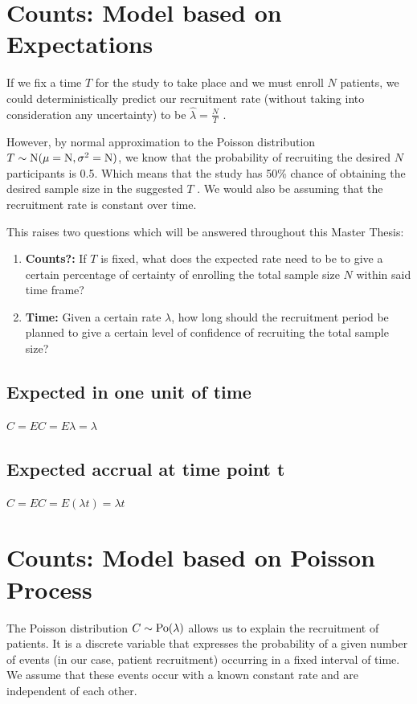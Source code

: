 \section{Counts: Model based on Expectations}

If we fix a time $T$ for the study to take place and we must enroll $N$ patients, we could deterministically predict our recruitment rate (without taking into consideration any uncertainty) to be $\hat{\lambda}=\frac{N}{T}$ . 

However, by normal approximation to the Poisson distribution $T\sim \rm{N}(\mu=N, \sigma^2=N)$, we know that the probability of recruiting the desired $N$ participants is 0.5. Which means that the study has 50\% chance of obtaining the desired sample size in the suggested $T$ \citep{carter2004application}. We would also be assuming that the recruitment rate is constant over time.

This raises two questions which will be answered throughout this Master Thesis:
\begin{enumerate}
\item \textbf{Counts?:} If $T$ is fixed, what does the expected rate need to be to give a certain percentage of certainty of enrolling the total sample size $N$ within said time frame?
\item \textbf{Time:} Given a certain rate $\lambda$, how long should the recruitment period be planned to give a certain level of confidence of recruiting the total sample size?
\end{enumerate}

\subsection{Expected in one unit of time}
$C = EC = E\lambda = \lambda$

\subsection{Expected accrual at time point t}
$C = EC = E(\lambda t) = \lambda t$

\section{Counts: Model based on Poisson Process}

The Poisson distribution $C\sim \rm{Po} (\lambda)$ allows us to explain the recruitment of patients. It is a discrete variable that expresses the probability of a given number of events (in our case, patient recruitment) occurring in a fixed interval of time. We assume that these events occur with a known constant rate and are independent of each other.

